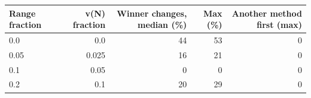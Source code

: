 \begin{tabular}{lrrrr}
\toprule
Range fraction & v(N) fraction & Winner changes, median (\%) & Max (\%) & Another method first (max) \\
\midrule
0.0 & 0.0 & 44 & 53 & 0 \\
0.05 & 0.025 & 16 & 21 & 0 \\
0.1 & 0.05 & 0 & 0 & 0 \\
0.2 & 0.1 & 20 & 29 & 0 \\
\bottomrule
\end{tabular}
